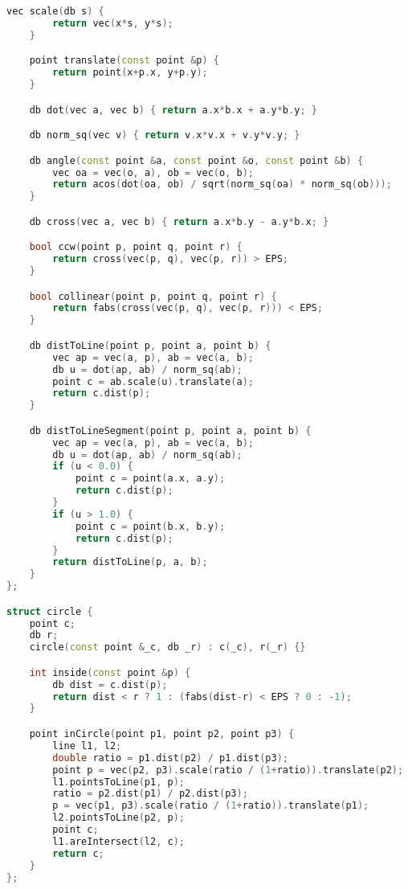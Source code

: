 \documentclass[leter]{amsart}
\begin{document}
\begin{multicols}{2}
\begin{lstlisting}[language=C++]
    vec scale(db s) {
        return vec(x*s, y*s);
    }

    point translate(const point &p) {
        return point(x+p.x, y+p.y);
    }

    db dot(vec a, vec b) { return a.x*b.x + a.y*b.y; }

    db norm_sq(vec v) { return v.x*v.x + v.y*v.y; }

    db angle(const point &a, const point &o, const point &b) {
        vec oa = vec(o, a), ob = vec(o, b); 
        return acos(dot(oa, ob) / sqrt(norm_sq(oa) * norm_sq(ob)));
    }

    db cross(vec a, vec b) { return a.x*b.y - a.y*b.x; }

    bool ccw(point p, point q, point r) {
        return cross(vec(p, q), vec(p, r)) > EPS;
    }

    bool collinear(point p, point q, point r) {
        return fabs(cross(vec(p, q), vec(p, r))) < EPS;
    }

    db distToLine(point p, point a, point b) {
        vec ap = vec(a, p), ab = vec(a, b);
        db u = dot(ap, ab) / norm_sq(ab);
        point c = ab.scale(u).translate(a);
        return c.dist(p);
    }

    db distToLineSegment(point p, point a, point b) {
        vec ap = vec(a, p), ab = vec(a, b);
        db u = dot(ap, ab) / norm_sq(ab);
        if (u < 0.0) {
            point c = point(a.x, a.y);
            return c.dist(p);
        }
        if (u > 1.0) {
            point c = point(b.x, b.y);
            return c.dist(p);
        }
        return distToLine(p, a, b); 
    }
};

struct circle {
    point c;
    db r;
    circle(const point &_c, db _r) : c(_c), r(_r) {}

    int inside(const point &p) {
        db dist = c.dist(p);
        return dist < r ? 1 : (fabs(dist-r) < EPS ? 0 : -1);
    }

    point inCircle(point p1, point p2, point p3) {
        line l1, l2;
        double ratio = p1.dist(p2) / p1.dist(p3);
        point p = vec(p2, p3).scale(ratio / (1+ratio)).translate(p2);
        l1.pointsToLine(p1, p);
        ratio = p2.dist(p1) / p2.dist(p3);
        p = vec(p1, p3).scale(ratio / (1+ratio)).translate(p1);
        l2.pointsToLine(p2, p);
        point c;
        l1.areIntersect(l2, c);
        return c;
    }
};


\end{lstlisting}
\end{multicols}
\end{document}
